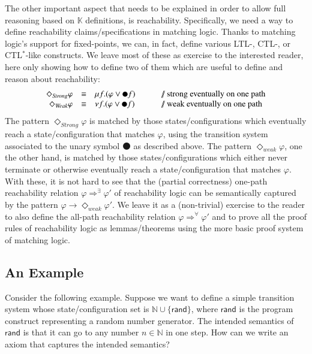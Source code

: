 \documentclass[UTF8,11pt]{article}
\theoremstyle{plain}
\theoremstyle{definition}
\theoremstyle{remark}
\newcommand{\K}{\mbox{$\mathbb{K}$}\xspace}
\newcommand{\snext}{{\medbullet}}
\newcommand{\doubleslash}{/\!/{ }}
\newcommand{\nats}{\mathbb{N}}
\newcommand{\rand}{\mathsf{rand}}
\begin{document}
The other important aspect that needs to be explained in order to allow
full reasoning based on \K definitions, is reachability.
Specifically, we need a way to define reachability claims/specifications
in matching logic.
Thanks to matching logic's support for fixed-points, we can, in fact,
define various LTL-, CTL-, or CTL$^*$-like constructs.
We leave most of these as exercise to the interested reader,
here only showing how to define two of them which are useful to define
and reason about reachability:
$$
\begin{array}{rcl@{\hspace*{7ex}}l}
\Diamond_{\textit{Strong}} \varphi & \equiv & \mu f . (\varphi \vee \snext f)
& \textrm{\doubleslash strong eventually on one path}
\\
\Diamond_{\textit{Weak}} \varphi & \equiv & \nu f . (\varphi \vee \snext f)
& \textrm{\doubleslash weak eventually on one path}
\end{array}
$$
The pattern $\Diamond_{\textit{Strong}}\varphi$ is matched by those
states/configurations which eventually reach a state/configuration that
matches $\varphi$, using the transition system associated to the unary
symbol $\snext$ as described above.
The pattern $\Diamond_{\textit{weak}}\varphi$, one the other hand, is matched
by those states/configurations which either never terminate or otherwise
eventually reach a state/configuration that matches $\varphi$.
With these, it is not hard to see that the (partial correctness) one-path
reachability relation $\varphi \Rightarrow^\exists \varphi'$ of reachability
logic \cite{stefanescu-park-yuwen-li-rosu-2016-oopsla} can be semantically
captured by the pattern
$\varphi \rightarrow \Diamond_{\textit{weak}}\varphi'$.
We leave it as a (non-trivial) exercise to the reader to also define the
all-path reachability relation $\varphi \Rightarrow^\forall\varphi'$ and to
prove all the proof rules of reachability logic as lemmas/theorems using the
more basic proof system of matching logic.

\subsection{An Example}

Consider the following example.
Suppose we want to define a simple transition system
whose state/configuration set is $\nats \cup \{ \rand \}$,
where $\rand$ is the program construct representing a random number generator.
The intended semantics of $\rand$ is that it can go to any number $n \in \nats$
in one step.
How can we write an axiom that captures the intended semantics?
\end{document}
